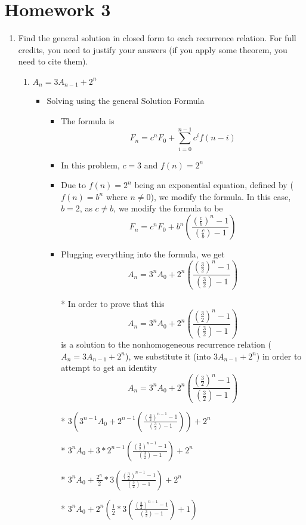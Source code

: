 
\section{Homework 3}
\begin{enumerate}
\item Find the general solution in closed form to each recurrence relation. For full credits, you need to justify your answers (if you apply some theorem, you need to cite them).
  \begin{enumerate}
  \item $A_{n}=3A_{n-1}+2^{n}$
    \begin{itemize} %
    \item Solving using the general Solution Formula
      \begin{itemize} %
      \item The formula is $$F_{n}=c^{n}F_{0} + \sum\limits_{i=0}^{n-1}c^{i}f(n-i)$$
      \item In this problem, $c=3$ and $f(n)=2^{n}$
      \item Due to $f(n)=2^{n}$ being an exponential equation, defined by ($f(n)=b^{n}$ where $n\neq0$), we modify the formula. In this case, $b=2$, as $c\neq b$, we modify the formula to be $$F_{n}=c^{n}F_{0} + b^{n}\left(\frac{(\frac{c}{b})^{n}-1}{(\frac{c}{b})-1}\right)$$
      \item Plugging everything into the formula, we get $$A_{n}=3^{n}A_{0} + 2^{n}\left(\frac{(\frac{3}{2})^{n}-1}{(\frac{3}{2})-1}\right)$$
      \item [*] In order to prove that this $$A_{n}=3^{n}A_{0} + 2^{n}\left(\frac{(\frac{3}{2})^{n}-1}{(\frac{3}{2})-1}\right)$$ is a solution to the nonhomogeneous recurrence relation ($A_{n}=3A_{n-1}+2^{n}$), we substitute it (into $3A_{n-1}+2^{n}$) in order to attempt to get an identity $$A_{n}=3^{n}A_{0} + 2^{n}\left(\frac{(\frac{3}{2})^{n}-1}{(\frac{3}{2})-1}\right)$$
      \item [*] $3\left(3^{n-1}A_{0} + 2^{n-1}\left(\frac{(\frac{3}{2})^{n-1}-1}{(\frac{3}{2})-1}\right)\right)+2^{n}$
      \item [*] $3^{n}A_{0} + 3*2^{n-1}\left(\frac{(\frac{3}{2})^{n-1}-1}{(\frac{3}{2})-1}\right)+2^{n}$
      \item [*] $3^{n}A_{0} + \frac{2^{n}}{2}*3\left(\frac{(\frac{3}{2})^{n-1}-1}{(\frac{3}{2})-1}\right)+2^{n}$
      \item [*] $3^{n}A_{0} + 2^{n} \left(\frac{1}{2}*3\left(\frac{(\frac{3}{2})^{n-1}-1}{(\frac{3}{2})-1}\right)+1\right)$

\end{itemize}
\end{itemize}
\end{enumerate}
\end{enumerate}
